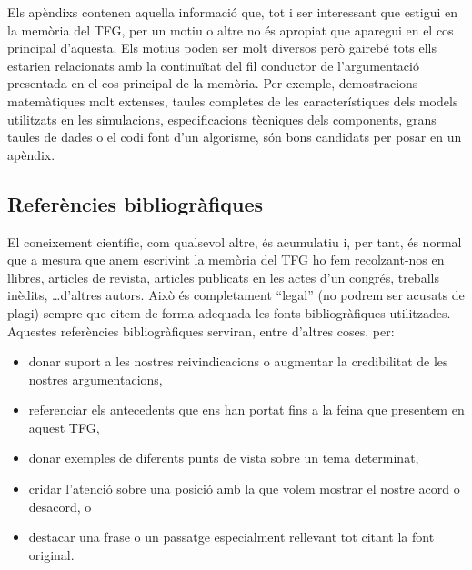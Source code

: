 Els apèndixs contenen aquella informació que, tot i ser interessant que estigui en la memòria del \ac{TFG}, per un motiu o altre no és apropiat que aparegui en el cos principal d'aquesta. Els motius poden ser molt diversos però gairebé tots ells estarien relacionats amb la continuïtat del fil conductor de l'argumentació presentada en el cos principal de la memòria. Per exemple, demostracions matemàtiques molt extenses, taules completes de les característiques dels models utilitzats en les simulacions, especificacions tècniques dels components, grans taules de dades o el codi font d'un algorisme, són bons candidats per posar en un apèndix.

\subsection{Referències bibliogràfiques}

El coneixement científic, com qualsevol altre, és acumulatiu i, per tant, és normal que a mesura que anem escrivint la memòria del \ac{TFG} ho fem recolzant-nos en llibres, articles de revista, articles publicats en les actes d'un congrés, treballs inèdits, \ldots d'altres autors. Això és completament ``legal'' (no podrem ser acusats de plagi) sempre que citem de forma adequada les fonts bibliogràfiques utilitzades. Aquestes referències bibliogràfiques serviran, entre d'altres coses, per:
\begin{itemize}\tightlist
   \item donar suport a les nostres reivindicacions o augmentar la credibilitat de les nostres argumentacions,
   \item referenciar els antecedents que ens han portat fins a la feina que presentem en aquest \ac{TFG},
   \item donar exemples de diferents punts de vista sobre un tema determinat,
   \item cridar l'atenció sobre una posició amb la que volem mostrar el nostre acord o desacord, o
   \item destacar una frase o un passatge especialment rellevant tot citant la font original.
\end{itemize}
